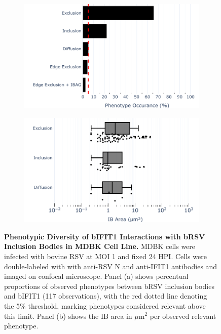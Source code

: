 \begin{figure}
    \begin{subfigure}{0.495\textwidth}
        \caption{}
        \includegraphics[width=1\linewidth]{08. Chapter 3/Figs/02. Infection/01. IFIT1/07. bar_i1_mdbk.pdf} 
    \end{subfigure}
    \begin{subfigure}{0.495\textwidth}
        \caption{}
        \includegraphics[width=1\linewidth]{08. Chapter 3/Figs/02. Infection/01. IFIT1/08. box_i1_mdbk.pdf}
    \end{subfigure}
    \caption[Phenotypic Diversity of bIFIT1 Interactions with bRSV Inclusion Bodies in MDBK Cell Line.]{\textbf{Phenotypic Diversity of bIFIT1 Interactions with bRSV Inclusion Bodies in MDBK Cell Line.} MDBK cells were infected with bovine RSV at MOI 1 and fixed 24 HPI. Cells were double-labeled with with anti-RSV N and anti-IFIT1 antibodies and imaged on confocal microscope. Panel (a) shows percentual proportions of observed phenotypes between bRSV inclusion bodies and bIFIT1 (117 observations), with the red dotted line denoting the 5\% threshold, marking phenotypes considered relevant above this limit. Panel (b) shows the IB area in \(\mu \mbox{m}^2\) per observed relevant phenotype.}
    \label{fig:Phenotypic Diversity of bIFIT1 Interactions with bRSV Inclusion Bodies in MDBK Cell Line}
\end{figure}

